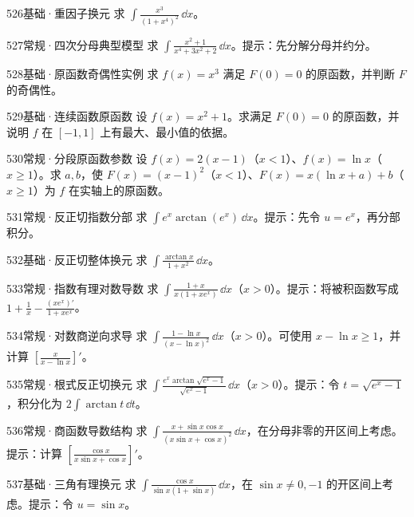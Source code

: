 \begin{exercise}{526}{基础·重因子换元}
求 $\int\frac{x^3}{(1+x^4)^2}\,\dd x$。
\end{exercise}
\begin{exercise}{527}{常规·四次分母典型模型}
求 $\int\frac{x^2+1}{x^4+3x^2+2}\,\dd x$。提示：先分解分母并约分。
\end{exercise}
\begin{exercise}{528}{基础·原函数奇偶性实例}
求 $f(x)=x^3$ 满足 $F(0)=0$ 的原函数，并判断 $F$ 的奇偶性。
\end{exercise}
\begin{exercise}{529}{基础·连续函数原函数}
设 $f(x)=x^2+1$。求满足 $F(0)=0$ 的原函数，并说明 $f$ 在 $[-1,1]$ 上有最大、最小值的依据。
\end{exercise}
\begin{exercise}{530}{常规·分段原函数参数}
设 $f(x)=2(x-1)$（$x<1$）、$f(x)=\ln x$（$x\ge1$）。求 $a,b$，使 $F(x)=(x-1)^2$（$x<1$）、$F(x)=x(\ln x+a)+b$（$x\ge1$）为 $f$ 在实轴上的原函数。
\end{exercise}
\begin{exercise}{531}{常规·反正切指数分部}
求 $\int e^x\arctan(e^x)\,\dd x$。提示：先令 $u=e^x$，再分部积分。
\end{exercise}
\begin{exercise}{532}{基础·反正切整体换元}
求 $\int\frac{\arctan x}{1+x^2}\,\dd x$。
\end{exercise}
\begin{exercise}{533}{常规·指数有理对数导数}
求 $\int\frac{1+x}{x(1+xe^x)}\,\dd x$（$x>0$）。提示：将被积函数写成 $1+\frac{1}{x}-\frac{(xe^x)'}{1+xe^x}$。
\end{exercise}
\begin{exercise}{534}{常规·对数商逆向求导}
求 $\int\frac{1-\ln x}{(x-\ln x)^2}\,\dd x$（$x>0$）。可使用 $x-\ln x\ge1$，并计算 $[\frac{x}{x-\ln x}]'$。
\end{exercise}
\begin{exercise}{535}{常规·根式反正切换元}
求 $\int\frac{e^x\arctan\sqrt{e^x-1}}{\sqrt{e^x-1}}\,\dd x$（$x>0$）。提示：令 $t=\sqrt{e^x-1}$，积分化为 $2\int\arctan t\,\dd t$。
\end{exercise}
\begin{exercise}{536}{常规·商函数导数结构}
求 $\int\frac{x+\sin x\cos x}{(x\sin x+\cos x)^2}\,\dd x$，在分母非零的开区间上考虑。提示：计算 $[\frac{\cos x}{x\sin x+\cos x}]'$。
\end{exercise}
\begin{exercise}{537}{基础·三角有理换元}
求 $\int\frac{\cos x}{\sin x(1+\sin x)}\,\dd x$，在 $\sin x\ne0,-1$ 的开区间上考虑。提示：令 $u=\sin x$。
\end{exercise}
